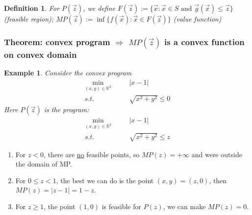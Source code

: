 \documentclass[11pt,a4paper]{article}
\newtheorem{theorem}{Theorem}
\newtheorem{example}{Example}
\newtheorem{definition}{Definition}
\begin{document}
\begin{definition}
    For $P(\vec{z})$, we define $F(\vec{z}):=\{\vec{x}: \vec{x}\in S \text{ and }\vec{g}(\vec{x})\leq \vec{z}\}$ (feasible region); $MP(\vec{z}):=\inf\{f(\vec{x}):\vec{x}\in F(\vec{z})\}$ (value function)
\end{definition}

\subsubsection{Theorem: convex program $\Rightarrow$ $MP(\vec{z})$ is a convex function on convex domain}
\begin{center}
\end{center}
\begin{example}
    Consider the convex program
    \begin{equation}
        \begin{aligned}
            \min_{(x,y)\in \mathbb{R}^2}&\quad &|x-1|\\
            s.t.& &\sqrt{x^2+y^2}\leq 0
        \end{aligned}
        \nonumber
    \end{equation}
    Here $P(\vec{z})$ is the program:
    \begin{equation}
        \begin{aligned}
            \min_{(x,y)\in \mathbb{R}^2}&\quad &|x-1|\\
            s.t.& &\sqrt{x^2+y^2}\leq z
        \end{aligned}
        \nonumber
    \end{equation}
\end{example}
\begin{enumerate}
    \item For $z<0$, there are \underline{no} feasible points, so $MP(z)=+\infty$ and were outside the domain of MP.
    \item For $0\leq z<1$, the best we can do is the point $(x,y)=(z,0)$, then $MP(z)=|z-1|=1-z$.
    \item For $z\geq 1$, the point $(1,0)$ is feasible for $P(z)$, we can make $MP(z)=0$.
\end{enumerate}
\end{document}
